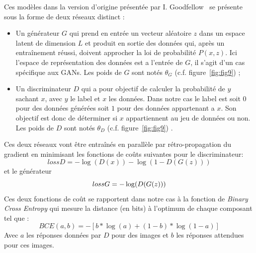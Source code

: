 \documentclass[11pt,francais]{article}
\begin{document}
Ces modèles dans la version d'origine présentée par I. Goodfellow~\cite{NIPS2014_5423} se présente sous la forme de deux réseaux distinct : \\
\begin{itemize}
  \item Un générateur \(G\) qui prend en entrée un vecteur aléatoire \(z\) dans un espace latent de dimension \(L\) et produit en sortie des données qui, après un entraînement réussi, doivent approcher la loi de probabilité \(P(x,z)\). Ici l'espace de représentation des données est a l'entrée de \(G\), il s'agit d'un cas spécifique aux GANs. Les poids de \(G\) sont notés \(\theta_G\) (c.f. figure~\ref{fig:fig9}) ;
  
  \item Un discriminateur \(D\) qui a pour objectif de calculer la probabilité de \(y\) sachant \(x\), avec \(y\) le label et \(x\) les données. Dans notre cas le label est soit \(0\) pour des données générées soit \(1\) pour des données appartenant a \(x\). Son objectif est donc de déterminer si \(x\) appartiennent au jeu de données ou non. Les poids de \(D\) sont notés \(\theta_D\) (c.f. figure~\ref{fig:fig9}) .
\end{itemize}
Ces deux réseaux vont être entraînés en parallèle par rétro-propagation du gradient en minimisant les fonctions de coûts suivantes pour le discriminateur:
$$
lossD = -\log(D(x)) - \log(1-D(G(z))) 
$$
et le générateur
$$
lossG = -\log(D(G(z)))  \\
$$
Ces deux fonctions de coût se rapportent dans notre cas à la fonction de \textit{Binary Cross Entropy} qui mesure la distance (en bits) à l'optimum de chaque composant tel que : 
\[
BCE(a, b) = -[b * \log(a) + (1 - b) * \log(1 - a)]
\]
Avec \(a\) les réponses données par \(D\) pour des images et \(b\) les réponses attendues pour ces images.
\end{document}
